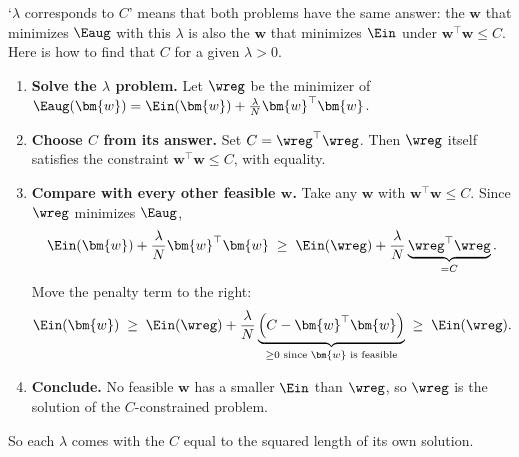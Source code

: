 \begin{remark}\label{rem:lambda-c}
    `\(\lambda\) corresponds to \(C\)' means that both problems have the same
    answer: the \(\bm{w}\) that minimizes \(\Eaug\) with this \(\lambda\) is also
    the \(\bm{w}\) that minimizes \(\Ein\) under \(\bm{w}^\top \bm{w} \le C\).
    Here is how to find that \(C\) for a given \(\lambda > 0\).
    \begin{enumerate}[(1)]
        \item \textbf{Solve the \(\lambda\) problem.} Let \(\wreg\) be the
            minimizer of \(\Eaug(\bm{w}) = \Ein(\bm{w}) + \frac{\lambda}{N}
            \bm{w}^\top \bm{w}\).
        \item \textbf{Choose \(C\) from its answer.} Set \(C = \wreg^\top
            \wreg\). Then \(\wreg\) itself satisfies the constraint \(\bm{w}^\top
            \bm{w} \le C\), with equality.
        \item \textbf{Compare with every other feasible \(\bm{w}\).} Take any
            \(\bm{w}\) with \(\bm{w}^\top \bm{w} \le C\). Since \(\wreg\)
            minimizes \(\Eaug\),
            \[
                \Ein(\bm{w}) + \frac{\lambda}{N} \bm{w}^\top \bm{w} \;\ge\;
                \Ein(\wreg) + \frac{\lambda}{N} \underbrace{\wreg^\top
                \wreg}_{= C} .
            \]
            Move the penalty term to the right:
            \[
                \Ein(\bm{w}) \;\ge\; \Ein(\wreg) + \frac{\lambda}{N}
                \underbrace{\left( C - \bm{w}^\top \bm{w} \right)}_{\ge 0
                \text{ since } \bm{w} \text{ is feasible}} \;\ge\;
                \Ein(\wreg) .
            \]
        \item \textbf{Conclude.} No feasible \(\bm{w}\) has a smaller \(\Ein\)
            than \(\wreg\), so \(\wreg\) is the solution of the
            \(C\)-constrained problem.
    \end{enumerate}
    So each \(\lambda\) comes with the \(C\) equal to the squared length of its
    own solution.


\end{remark}
